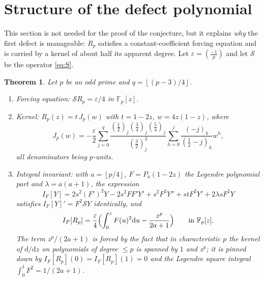 \documentclass[11pt]{amsart}
\newtheorem{theorem}{Theorem}[section]
\theoremstyle{definition}
\theoremstyle{remark}
\newcommand{\dd}{\mathrm{d}}
\newcommand{\Fp}{\mathbb{F}_p}
\newcommand{\leg}[2]{\left(\frac{#1}{#2}\right)}
\newcommand{\fl}[1]{\left\lfloor #1 \right\rfloor}
\begin{document}
\section{Structure of the defect polynomial}\label{sec:5}

This section is not needed for the proof of the conjecture, but it
explains \emph{why} the first defect is manageable: $R_p$ satisfies a
constant-coefficient forcing equation and is carried by a kernel of
about half its apparent degree. Let $\varepsilon=\leg{-1}{p}$ and let
$\mathcal S$ be the operator \eqref{eq:S}.

\begin{theorem}\label{thm:D}
Let $p$ be an odd prime and $q=\fl{(p-3)/4}$.
\begin{enumerate}[label=\textup{(\roman*)},leftmargin=2.2em]
\item Forcing equation:
$\mathcal SR_p=\varepsilon/4$ in $\Fp[z]$.
\item Kernel: $R_p(z)=t\,J_p(w)$ with $t=1-2z$, $w=4z(1-z)$, where
\begin{equation}\label{eq:kernel}
J_p(w)=-\frac{\varepsilon}{2}\sum_{j=0}^{q}
\frac{(\frac12)_j(\frac34)_j(\frac54)_j}{(\frac32)_j^3}
\sum_{h=0}^{j}\frac{(-j)_h}{(\frac12-j)_h}w^h ,
\end{equation}
all denominators being $p$-units.
\item Integral invariant: with $a=\fl{p/4}$, $F=P_a(1-2z)$ the Legendre
polynomial part and $\lambda=a(a+1)$, the expression
\[
I_F[Y]=2s^2(F')^2Y-2s^2FF'Y'+s^2F^2Y''+stF^2Y'+2\lambda sF^2Y
\]
satisfies $I_F[Y]'=F^2\mathcal SY$ identically, and
\[
I_F[R_p]=\frac{\varepsilon}{4}\Bigl(\int_0^zF(u)^2\dd u-\frac{z^p}{2a+1}\Bigr)
\qquad\text{in }\Fp[z].
\]
The term $z^p/(2a+1)$ is forced by the fact that in characteristic $p$
the kernel of $\dd/\dd z$ on polynomials of degree $\le p$ is spanned by
$1$ and $z^p$; it is pinned down by $I_F[R_p](0)=I_F[R_p](1)=0$ and the
Legendre square integral $\int_0^1F^2=1/(2a+1)$.
\end{enumerate}
\end{theorem}
\end{document}
